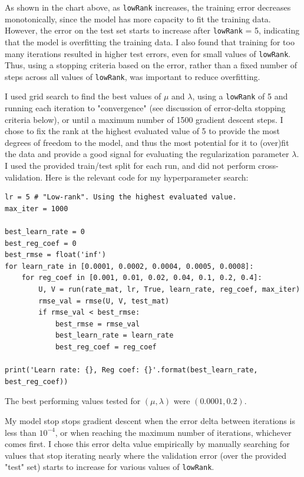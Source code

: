 \documentclass{article}
\begin{document}
As shown in the chart above, as \verb|lowRank| increases, the training error decreases monotonically, since the model has more capacity to fit the training data.
However, the error on the test set starts to increase after \verb|lowRank| = 5, indicating that the model is overfitting the training data.
I also found that training for too many iterations resulted in higher test errors, even for small values of \verb|lowRank|.
Thus, using a stopping criteria based on the error, rather than a fixed number of steps across all values of \verb|lowRank|, was important to reduce overfitting.

I used grid search to find the best values of $\mu$ and $\lambda$, using a \verb|lowRank| of 5 and running each iteration to "convergence" (see discussion of error-delta stopping criteria below), or until a maximum number of 1500 gradient descent steps.
I chose to fix the rank at the highest evaluated value of 5 to provide the most degrees of freedom to the model, and thus the most potential for it to (over)fit the data and provide a good signal for evaluating the regularization parameter $\lambda$.
I used the provided train/test split for each run, and did not perform cross-validation.
Here is the relevant code for my hyperparameter search:

\begin{verbatim}
lr = 5 # "Low-rank". Using the highest evaluated value.
max_iter = 1000

best_learn_rate = 0
best_reg_coef = 0
best_rmse = float('inf')
for learn_rate in [0.0001, 0.0002, 0.0004, 0.0005, 0.0008]:
    for reg_coef in [0.001, 0.01, 0.02, 0.04, 0.1, 0.2, 0.4]:
        U, V = run(rate_mat, lr, True, learn_rate, reg_coef, max_iter)
        rmse_val = rmse(U, V, test_mat)
        if rmse_val < best_rmse:
            best_rmse = rmse_val
            best_learn_rate = learn_rate
            best_reg_coef = reg_coef

print('Learn rate: {}, Reg coef: {}'.format(best_learn_rate, best_reg_coef)) 
\end{verbatim}

The best performing values tested for $(\mu, \lambda)$ were $(0.0001, 0.2)$.

My model stop stops gradient descent when the error delta between iterations is less than $10^{-4}$, or when reaching the maximum number of iterations, whichever comes first.
I chose this error delta value empirically by manually searching for values that stop iterating nearly where the validation error (over the provided "test" set) starts to increase for various values of \verb|lowRank|.
\end{document}
